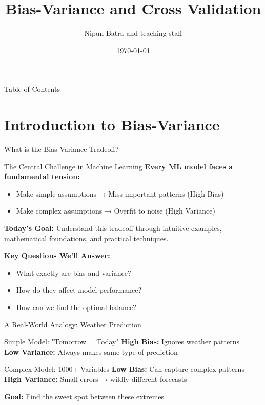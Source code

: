 \documentclass{beamer}
\title{Bias-Variance and Cross Validation}
\date{\today}
\author{Nipun Batra and teaching staff}
\institute{IIT Gandhinagar}
\begin{document}
\maketitle

\begin{frame}{Table of Contents}
\tableofcontents
\end{frame}

\section{Introduction to Bias-Variance}

\begin{frame}{What is the Bias-Variance Tradeoff?}
\begin{alertbox}{The Central Challenge in Machine Learning}
\textbf{Every ML model faces a fundamental tension:}
\begin{itemize}
\item Make simple assumptions → Miss important patterns (High Bias)
\item Make complex assumptions → Overfit to noise (High Variance)
\end{itemize}
\end{alertbox}

\textbf{Today's Goal:} Understand this tradeoff through intuitive examples, mathematical foundations, and practical techniques.

\begin{keypointsbox}
\textbf{Key Questions We'll Answer:}
\begin{itemize}
\item What exactly are bias and variance?
\item How do they affect model performance?
\item How can we find the optimal balance?
\end{itemize}
\end{keypointsbox}
\end{frame}

\begin{frame}{A Real-World Analogy: Weather Prediction}
\begin{examplebox}{Simple Model: "Tomorrow = Today"}
\textbf{High Bias:} Ignores weather patterns \\
\textbf{Low Variance:} Always makes same type of prediction
\end{examplebox}

\begin{examplebox}{Complex Model: 1000+ Variables}
\textbf{Low Bias:} Can capture complex patterns \\
\textbf{High Variance:} Small errors → wildly different forecasts
\end{examplebox}

\textbf{Goal:} Find the sweet spot between these extremes
\end{frame}
\end{document}
